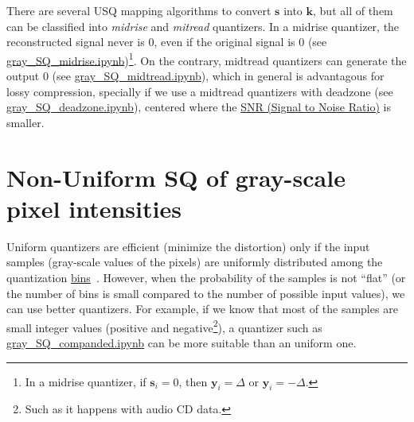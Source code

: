There are several USQ mapping algorithms to convert $\mathbf{s}$ into
$\mathbf{k}$, but all of them can be classified into \emph{midrise}
and \emph{mitread} quantizers. In a midrise quantizer, the
reconstructed signal never is 0, even if the original signal is 0 (see
\href{https://github.com/Sistemas-Multimedia/Sistemas-Multimedia.github.io/blob/master/contents/gray_SQ/gray_SQ_midrise.ipynb}{gray\_SQ\_midrise.ipynb})\footnote{In
a midrise quantizer, if $\mathbf{s}_i=0$, then $\mathbf{y}_i=\Delta$
or $\mathbf{y}_i=-\Delta$.}. On the contrary, midtread quantizers can
generate the output 0 (see
\href{https://github.com/Sistemas-Multimedia/Sistemas-Multimedia.github.io/blob/master/contents/gray_SQ/gray_SQ_midtread.ipynb}{gray\_SQ\_midtread.ipynb}),
which in general is advantagous for lossy compression, specially if we
use a midtread quantizers with deadzone (see
\href{https://github.com/Sistemas-Multimedia/Sistemas-Multimedia.github.io/blob/master/contents/gray_SQ/gray_SQ_deadzone.ipynb}{gray\_SQ\_deadzone.ipynb}),
centered where the
\href{https://en.wikipedia.org/wiki/Signal-to-noise_ratio}{SNR (Signal
  to Noise Ratio)} is smaller.

\section{Non-Uniform SQ of gray-scale pixel intensities}
Uniform quantizers are efficient (minimize the distortion) only if the
input samples (gray-scale values of the pixels) are uniformly
distributed among the quantization
\href{https://en.wikipedia.org/wiki/Data_binning}{bins}~\cite{vruiz__scalar_quantization}. However,
when the probability of the samples is not ``flat'' (or the number of
bins is small compared to the number of possible input values), we can
use better quantizers. For example, if we know that most of the
samples are small integer values (positive and negative\footnote{Such
as it happens with audio CD data.}), a quantizer such as
\href{https://github.com/Sistemas-Multimedia/Sistemas-Multimedia.github.io/blob/master/contents/gray_SQ/gray_SQ_companded.ipynb}{gray\_SQ\_companded.ipynb}
can be more suitable than an uniform one.

